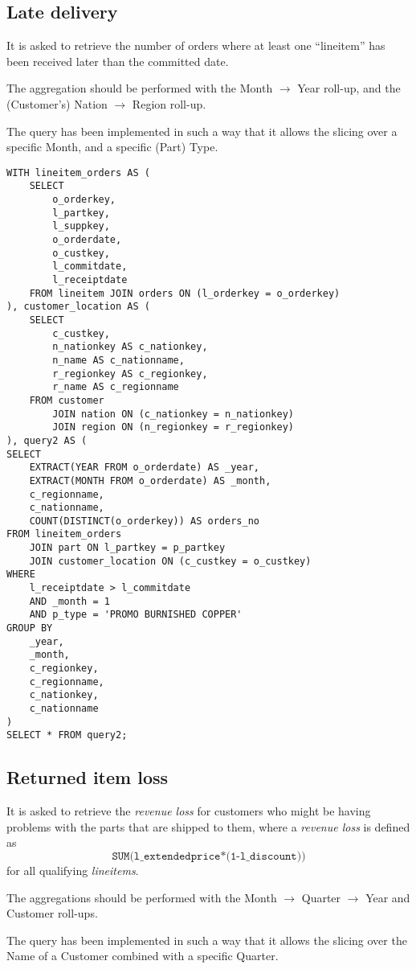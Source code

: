 \subsection{Late delivery}

It is asked to retrieve the number of orders where at least one ``lineitem'' has been received later than the committed date.

The aggregation should be performed with the Month $\rightarrow$ Year roll-up, and the (Customer's) Nation $\rightarrow$ Region roll-up.

The query has been implemented in such a way that it allows the slicing over a specific Month, and a specific (Part) Type.

\begin{lstlisting}
WITH lineitem_orders AS (
	SELECT
		o_orderkey, 
		l_partkey, 
		l_suppkey, 
		o_orderdate, 
		o_custkey,
		l_commitdate,
		l_receiptdate
	FROM lineitem JOIN orders ON (l_orderkey = o_orderkey)
), customer_location AS (
	SELECT 
		c_custkey, 
		n_nationkey AS c_nationkey, 
		n_name AS c_nationname, 
		r_regionkey AS c_regionkey, 
		r_name AS c_regionname 
	FROM customer 
		JOIN nation ON (c_nationkey = n_nationkey)
		JOIN region ON (n_regionkey = r_regionkey)
), query2 AS (
SELECT 
	EXTRACT(YEAR FROM o_orderdate) AS _year,
	EXTRACT(MONTH FROM o_orderdate) AS _month,
	c_regionname,
	c_nationname,
	COUNT(DISTINCT(o_orderkey)) AS orders_no
FROM lineitem_orders
	JOIN part ON l_partkey = p_partkey
	JOIN customer_location ON (c_custkey = o_custkey)
WHERE 
	l_receiptdate > l_commitdate
	AND _month = 1
	AND p_type = 'PROMO BURNISHED COPPER'
GROUP BY
	_year,
	_month,
	c_regionkey,
	c_regionname,
	c_nationkey,
	c_nationname
)
SELECT * FROM query2;
\end{lstlisting}


\subsection{Returned item loss}

It is asked to retrieve the \textit{revenue loss} for customers who might be having problems with the parts that are shipped to them, where a \textit{revenue loss} is defined as
$$ \texttt{SUM(l\_extendedprice*(1-l\_discount))}$$
for all qualifying \textit{lineitems}.

The aggregations should be performed with the Month $\rightarrow$ Quarter $\rightarrow$ Year and Customer roll-ups.

The query has been implemented in such a way that it allows the slicing over the Name of a Customer combined with a specific Quarter.

